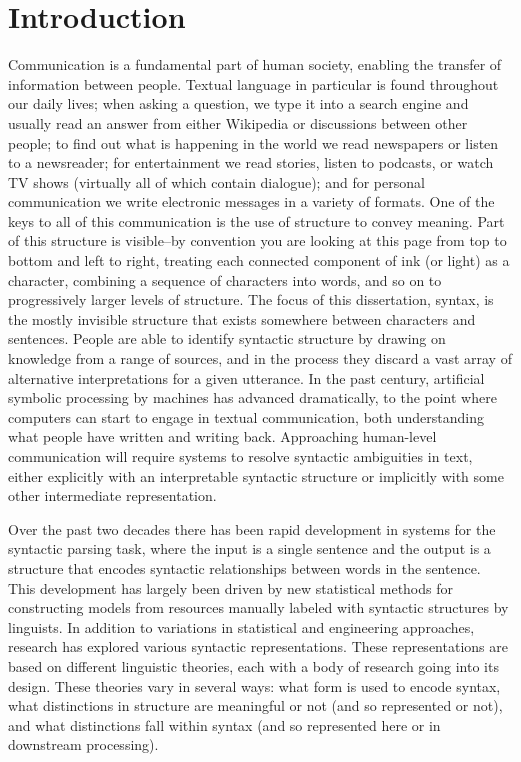 \chapter{Introduction}

Communication is a fundamental part of human society, enabling the transfer of information between people.
Textual language in particular is found throughout our daily lives;
when asking a question, we type it into a search engine and usually read an answer from either Wikipedia or discussions between other people;
to find out what is happening in the world we read newspapers or listen to a newsreader;
for entertainment we read stories, listen to podcasts, or watch TV shows (virtually all of which contain dialogue);
and for personal communication we write electronic messages in a variety of formats.
One of the keys to all of this communication is the use of structure to convey meaning.
Part of this structure is visible--by convention you are looking at this page from top to bottom and left to right, treating each connected component of ink (or light) as a character, combining a sequence of characters into words, and so on to progressively larger levels of structure.
The focus of this dissertation, syntax, is the mostly invisible structure that exists somewhere between characters and sentences.
People are able to identify syntactic structure by drawing on knowledge from a range of sources, and in the process they discard a vast array of alternative interpretations for a given utterance.
In the past century, artificial symbolic processing by machines has advanced dramatically, to the point where computers can start to engage in textual communication, both understanding what people have written and writing back.
Approaching human-level communication will require systems to resolve syntactic ambiguities in text, either explicitly with an interpretable syntactic structure or implicitly with some other intermediate representation.

Over the past two decades there has been rapid development in systems for the syntactic parsing task, where the input is a single sentence and the output is a structure that encodes syntactic relationships between words in the sentence.
This development has largely been driven by new statistical methods for constructing models from resources manually labeled with syntactic structures by linguists.
In addition to variations in statistical and engineering approaches, research has explored various syntactic representations.
These representations are based on different linguistic theories, each with a body of research going into its design.
These theories vary in several ways: what form is used to encode syntax, what distinctions in structure are meaningful or not (and so represented or not), and what distinctions fall within syntax (and so represented here or in downstream processing).

